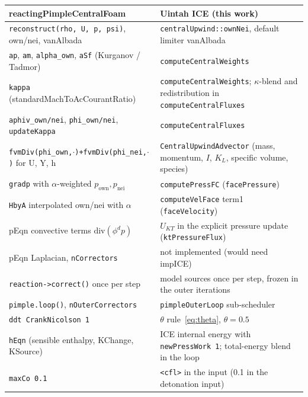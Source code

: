 \documentclass[11pt]{article}
\newcommand{\code}[1]{\texttt{\small #1}}
\newcommand{\own}{\mathrm{own}}
\newcommand{\nei}{\mathrm{nei}}
\begin{document}
\begin{center}
\small
\renewcommand{\arraystretch}{1.25}
\begin{tabularx}{\linewidth}{@{}>{\raggedright\arraybackslash}X >{\raggedright\arraybackslash}X@{}}
\toprule
\textbf{reactingPimpleCentralFoam} & \textbf{Uintah ICE (this work)} \\
\midrule
\code{reconstruct(rho, U, p, psi)}, own/nei, vanAlbada & \code{centralUpwind::ownNei}, default limiter vanAlbada \\
\code{ap}, \code{am}, \code{alpha\_own}, \code{aSf} (Kurganov / Tadmor) & \code{computeCentralWeights} \\
\code{kappa} (standardMachToAcCourantRatio) & \code{computeCentralWeights}; $\kappa$-blend and redistribution in \code{computeCentralFluxes} \\
\code{aphiv\_own/nei}, \code{phi\_own/nei}, \code{updateKappa} & \code{computeCentralFluxes} \\
\code{fvmDiv(phi\_own,$\cdot$)+fvmDiv(phi\_nei,$\cdot$)} for U, Y, h & \code{CentralUpwindAdvector} (mass, momentum, $I$, $K_L$, specific volume, species) \\
\code{gradp} with $\alpha$-weighted $p_\own,p_\nei$ & \code{computePressFC} (\code{facePressure}) \\
\code{HbyA} interpolated own/nei with $\alpha$ & \code{computeVelFace} term1 (\code{faceVelocity}) \\
pEqn convective terms $\mathrm{div}(\phi^d p)$ & $U_{KT}$ in the explicit pressure update (\code{ktPressureFlux}) \\
pEqn Laplacian, \code{nCorrectors} & not implemented (would need impICE) \\
\code{reaction->correct()} once per step & model sources once per step, frozen in the outer iterations \\
\code{pimple.loop()}, \code{nOuterCorrectors} & \code{pimpleOuterLoop} sub-scheduler \\
\code{ddt CrankNicolson 1} & $\theta$ rule~\eqref{eq:theta}, $\theta=0.5$ \\
\code{hEqn} (sensible enthalpy, KChange, KSource) & ICE internal energy with \code{newPressWork 1}; total-energy blend in the loop \\
\code{maxCo 0.1} & \code{<cfl>} in the input (0.1 in the detonation input) \\
\bottomrule
\end{tabularx}
\end{center}
\end{document}
